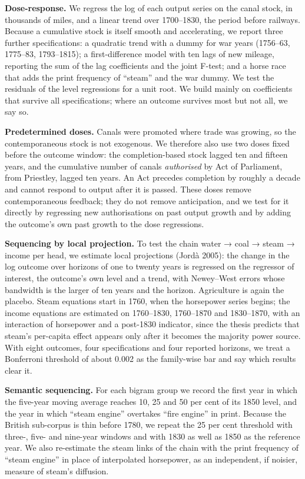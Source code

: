 \documentclass[
  11pt,
]{article}
\begin{document}
\textbf{Dose-response.} We regress the log of each output series on the
canal stock, in thousands of miles, and a linear trend over 1700--1830,
the period before railways. Because a cumulative stock is itself smooth
and accelerating, we report three further specifications: a quadratic
trend with a dummy for war years (1756--63, 1775--83, 1793--1815); a
first-difference model with ten lags of new mileage, reporting the sum
of the lag coefficients and the joint F-test; and a horse race that adds
the print frequency of ``steam'' and the war dummy. We test the
residuals of the level regressions for a unit root. We build mainly on
coefficients that survive all specifications; where an outcome survives
most but not all, we say so.

\textbf{Predetermined doses.} Canals were promoted where trade was
growing, so the contemporaneous stock is not exogenous. We therefore
also use two doses fixed before the outcome window: the completion-based
stock lagged ten and fifteen years, and the cumulative number of canals
\emph{authorised} by Act of Parliament, from Priestley, lagged ten
years. An Act precedes completion by roughly a decade and cannot respond
to output after it is passed. These doses remove contemporaneous
feedback; they do not remove anticipation, and we test for it directly
by regressing new authorisations on past output growth and by adding the
outcome's own past growth to the dose regressions.

\textbf{Sequencing by local projection.} To test the chain water → coal
→ steam → income per head, we estimate local projections (Jordà 2005):
the change in the log outcome over horizons of one to twenty years is
regressed on the regressor of interest, the outcome's own level and a
trend, with Newey--West errors whose bandwidth is the larger of ten
years and the horizon. Agriculture is again the placebo. Steam equations
start in 1760, when the horsepower series begins; the income equations
are estimated on 1760--1830, 1760--1870 and 1830--1870, with an
interaction of horsepower and a post-1830 indicator, since the thesis
predicts that steam's per-capita effect appears only after it becomes
the majority power source. With eight outcomes, four specifications and
four reported horizons, we treat a Bonferroni threshold of about 0.002
as the family-wise bar and say which results clear it.

\textbf{Semantic sequencing.} For each bigram group we record the first
year in which the five-year moving average reaches 10, 25 and 50 per
cent of its 1850 level, and the year in which ``steam engine'' overtakes
``fire engine'' in print. Because the British sub-corpus is thin before
1780, we repeat the 25 per cent threshold with three-, five- and
nine-year windows and with 1830 as well as 1850 as the reference year.
We also re-estimate the steam links of the chain with the print
frequency of ``steam engine'' in place of interpolated horsepower, as an
independent, if noisier, measure of steam's diffusion.
\end{document}
